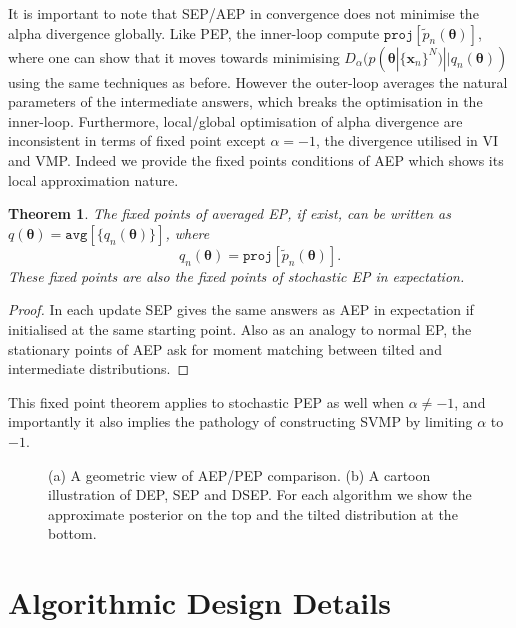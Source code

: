 \documentclass{article} %
\newtheorem{theorem}{Theorem}
\begin{document}
It is important to note that SEP/AEP in convergence does not minimise the alpha divergence globally. Like PEP, the inner-loop compute $\mathtt{proj}[\tilde{p}_n(\bm{\theta})]$, where one can show that it moves towards minimising $D_{\alpha}(p(\bm{\theta} | \{\bm{x}_n\}^N) || q_n(\bm{\theta}))$ using the same techniques as before. However the outer-loop averages the natural parameters of the intermediate answers, which breaks the optimisation in the inner-loop. Furthermore, local/global optimisation of alpha divergence are inconsistent in terms of fixed point except $\alpha = -1$, the divergence utilised in VI and VMP. Indeed we provide the fixed points conditions of AEP which shows its local approximation nature.
%
\begin{theorem}
The fixed points of averaged EP, if exist, can be written as $q(\bm{\theta}) = \mathtt{avg}[\{q_n(\bm{\theta})\}]$, where
\begin{equation}
q_n(\bm{\theta}) = \mathtt{proj}[\tilde{p}_n(\bm{\theta})].
\label{eq:mm}
\end{equation}
These fixed points are also the fixed points of stochastic EP in expectation. 
\end{theorem}
\begin{proof}
In each update SEP gives the same answers as AEP in expectation if initialised at the same starting point. Also as an analogy to normal EP, the stationary points of AEP ask for moment matching between tilted and intermediate distributions. 
\end{proof}
%
This fixed point theorem applies to stochastic PEP as well when $\alpha \neq -1$, and importantly it also implies the pathology of constructing SVMP by limiting $\alpha$ to $-1$. 

%
\begin{figure}
\centering
\def\svgwidth{0.35\linewidth}
\subfigure[\label{fig:aep_vs_pep}]{
}
%
\hspace{0.5in}
%
\def\svgwidth{0.4\linewidth}
\subfigure[\label{fig:dep_sep_dsep}]{
}

\caption{(a) A geometric view of AEP/PEP comparison. (b) A cartoon illustration of DEP, SEP and DSEP. For each algorithm we show the approximate posterior on the top and the tilted distribution at the bottom.}

\end{figure}

\section{Algorithmic Design Details}
%
\end{document}
